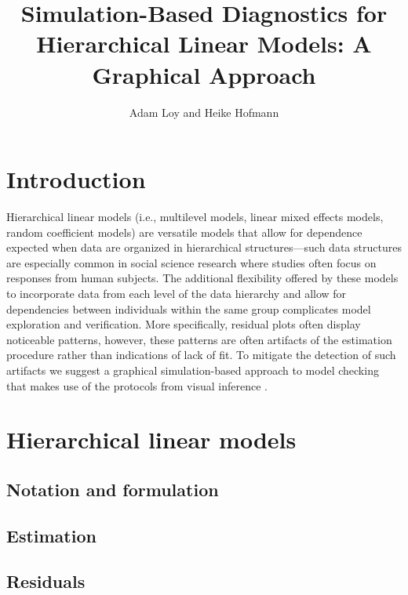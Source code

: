 \documentclass{article} %
\title{Simulation-Based Diagnostics for Hierarchical Linear Models: A Graphical Approach}
\author{Adam Loy and Heike Hofmann}
\begin{document}
\maketitle
\section{Introduction}

Hierarchical linear models (i.e., multilevel models, linear mixed effects models, random coefficient models) are versatile models that allow for dependence expected when data are organized in hierarchical structures---such data structures are especially common in social science research where studies often focus on responses from human subjects. The additional flexibility offered by these models to incorporate data from each level of the data hierarchy and allow for dependencies between individuals within the same group complicates model exploration and verification. More specifically, residual plots often display noticeable patterns, however, these patterns are often artifacts of the estimation procedure rather than indications of lack of fit. To mitigate the detection of such artifacts we suggest a graphical simulation-based approach to model checking that makes use of the protocols from visual inference \citep{Buja:2009hp}.




\section{Hierarchical linear models}\label{sec:hlms}

\subsection{Notation and formulation}

\subsection{Estimation}

\subsection{Residuals}
\end{document}
